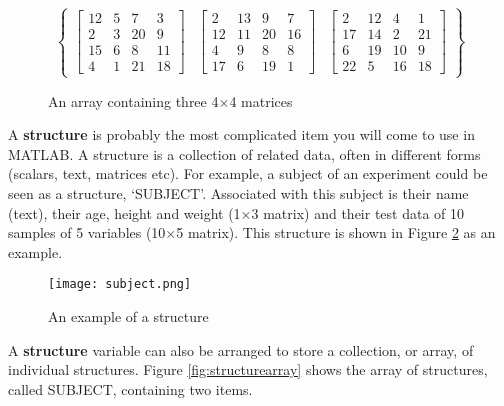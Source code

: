 \documentclass[12pt,a4paper]{article}
\begin{document}
{\begin{figure}[H]
	\[ \left\lbrace 
		\begin{array}{ccc}
		\left[ \begin{array}{cccc}
			12 & 5 & 7 & 3 \\
			2 & 3 & 20 & 9 \\
			15 & 6 & 8 & 11 \\
			4 & 1 & 21 & 18 \end{array} \right] &
		\left[ \begin{array}{cccc}
			2 & 13 & 9 & 7 \\
			12 & 11 & 20 & 16 \\
			4 & 9 & 8 & 8 \\
			17 & 6 & 19 & 1 \end{array} \right] &
		\left[ \begin{array}{cccc}
			2 & 12 & 4 & 1 \\
			17 & 14 & 2 & 21 \\
			6 & 19 & 10 & 9 \\
			22 & 5 & 16 & 18 \end{array} \right]
 		\end{array}
 	\right\rbrace \]
	\caption{An array containing three 4$\times$4 matrices}
	\label{fig:matrixarray}
\end{figure}

A \textbf{structure} is probably the most complicated item you will come to use in MATLAB.  
A structure is a collection of related data, often in different forms (scalars, text, matrices etc).  
For example, a subject of an experiment could be seen as a structure, `SUBJECT'.  
Associated with this subject is their name (text), their age, height and weight (1$\times$3 matrix) and their test data of 10 samples of 5 variables (10$\times$5 matrix).  
This structure is shown in Figure \ref{fig:structure} as an example.  

\begin{figure}[H]
    \begin{center}
        \texttt{[image: subject.png]}
        \caption{An example of a structure}
        \label{fig:structure}
    \end{center}
\end{figure}

A \textbf{structure} variable can also be arranged to store a collection, or array, of individual structures.   
Figure \ref{fig:structurearray} shows the array of structures, called SUBJECT, containing two items.

}
\end{document}
